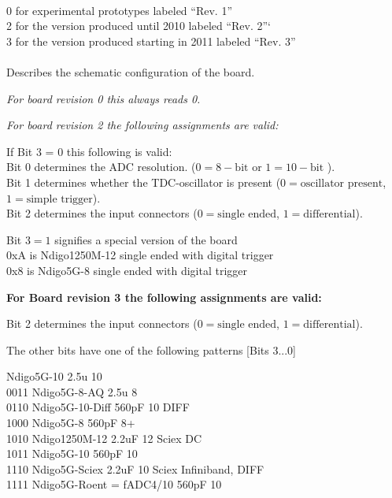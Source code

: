 			\\
			0 for experimental prototypes labeled ``Rev. 1''\\
			2 for the version produced until 2010 labeled ``Rev. 2''`\\
			3 for the version produced starting in 2011 labeled ``Rev. 3''\\
			
			\\
			Describes the schematic configuration of the board.\par

			\noindent\textit{For board revision 0 this always reads 0.}\par

			\noindent\textit{For board revision 2 the following assignments are valid:}\par

			\noindent If Bit 3 = 0 this following is valid:\\
			Bit 0 determines the ADC resolution. ($0 = 8-\text{bit}$ or $1 = 10-\text{bit}$ ).\\
			Bit 1 determines whether the TDC-oscillator is present ($0 = \text{oscillator present}$, $1 = \text{simple trigger}$).\\
			Bit 2 determines the input connectors ($0 = \text{single ended}$, $1 = \text{differential}$).\par

			\noindent Bit $3 = 1$ signifies a special version of the board\\
			0xA is Ndigo1250M-12 single ended with digital trigger\\
			0x8 is Ndigo5G-8 single ended with digital trigger\par
			
			\noindent\textbf{For Board revision 3 the following assignments are valid:}\par

			\noindent Bit 2 determines the input connectors ($0 = \text{single ended}$, $1 = \text{differential}$).\par

			\noindent The other bits have one of the following patterns [Bits 3...0]\par

			 Ndigo5G-10 2.5u 10\\
			0011 Ndigo5G-8-AQ 2.5u 8\\
			0110 Ndigo5G-10-Diff 560pF 10 DIFF\\
			1000 Ndigo5G-8 560pF 8+\\
			1010 Ndigo1250M-12 2.2uF 12 Sciex DC\\
			1011 Ndigo5G-10 560pF 10\\
			1110 Ndigo5G-Sciex 2.2uF 10 Sciex Infiniband, DIFF\\
			1111 Ndigo5G-Roent = fADC4/10 560pF 10\par

